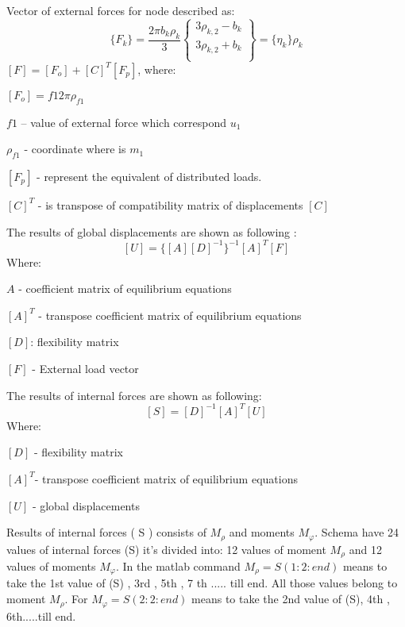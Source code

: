 Vector of external forces for node described as:
\begin{equation}\label{eqn:ExtrLoad}
    \{F_k\}=
    \frac{2\pi b_k\rho_k}{3}
    \left\{\begin{matrix}
        3\rho_{k,2}-b_k \\[2ex]
        3\rho_{k,2}+b_k \\[2ex]
    \end{matrix}\right\}
    =
    \{\eta_k\}\rho_k
\end{equation}
$[F]=[F_o]+[C]^T[F_p]$, where:\par
$[F_o]=f1 2\pi \rho_{f1} $\par
$f1$ – value of external force which correspond $u_1$\par
$\rho_{f1}$ - coordinate where is $m_1$\par
$[F_p]$ - represent the equivalent of distributed loads.\par
$[C]^T$ - is transpose of compatibility matrix of displacements $[C]$\par
{}
The results of global displacements are shown as following : 
\begin{equation}\label{eqn:Uglob}
    [U]=\{[A][D]^{-1}\}^{-1}[A]^T[F]
\end{equation}
Where:\par
$A$ - coefficient matrix of equilibrium equations\par
$[A]^T$ - transpose coefficient matrix of equilibrium equations\par
$[D]$: flexibility matrix\par
$[F]$ - External load vector\par
{}
\par
The results of internal forces are shown as following: 
\begin{equation}\label{eqn:Ulocal}
    [S]=[D]^{-1}[A]^T[U]
\end{equation}
Where:\par
$[D]$ - flexibility matrix \par 
$[A]^T$- transpose coefficient matrix of equilibrium equations\par 
$[U]$ - global displacements\par
Results of internal forces ( S ) consists of $M_{\rho}$ and moments $M_{\varphi}$. 
Schema have 24 values of internal forces (S) it's divided
into: 12 values of moment $M_{\rho}$ and 12 values of moments $M_{\varphi}$. In the matlab command
$M_{\rho}=S(1:2:end)$ means to take the 1st value of (S) , 3rd , 5th , 7 th ..... till end. All
those values belong to moment $M_{\rho}$. For $M_{\varphi}=S(2:2:end)$ means to take the 2nd value
of (S), 4th , 6th.....till end.\par
{}
